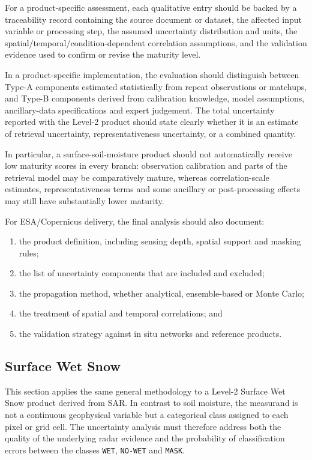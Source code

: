 For a product-specific assessment, each qualitative entry should be backed by a traceability record containing the source document or dataset, the affected input variable or processing step, the assumed uncertainty distribution and units, the spatial/temporal/condition-dependent correlation assumptions, and the validation evidence used to confirm or revise the maturity level.




\noindent In a product-specific implementation, the evaluation should distinguish
between Type-A components estimated statistically from repeat observations or
matchups, and Type-B components derived from calibration knowledge, model
assumptions, ancillary-data specifications and expert judgement. The total
uncertainty reported with the Level-2 product should state clearly whether it is
an estimate of retrieval uncertainty, representativeness uncertainty, or a
combined quantity.

\noindent In particular, a surface-soil-moisture product should not
automatically receive low maturity scores in every branch: observation
calibration and parts of the retrieval model may be comparatively mature,
whereas correlation-scale estimates, representativeness terms and some
ancillary or post-processing effects may still have substantially lower
maturity.

\noindent For ESA/Copernicus delivery, the final analysis should also document:
\begin{enumerate}
  \item the product definition, including sensing depth, spatial support and
  masking rules;
  \item the list of uncertainty components that are included and excluded;
  \item the propagation method, whether analytical, ensemble-based or Monte
  Carlo;
  \item the treatment of spatial and temporal correlations; and
  \item the validation strategy against in situ networks and reference products.
\end{enumerate}

\subsection{Surface Wet Snow}

This section applies the same general methodology to a Level-2 Surface Wet Snow
product derived from \ac{SAR}. In contrast to soil moisture, the measurand is
not a continuous geophysical variable but a categorical class assigned to each
pixel or grid cell. The uncertainty analysis must therefore address both the
quality of the underlying radar evidence and the probability of classification
errors between the classes \texttt{WET}, \texttt{NO-WET} and \texttt{MASK}.

